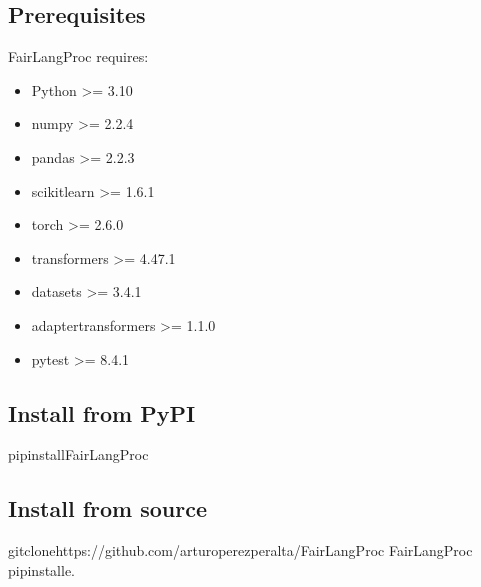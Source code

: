 \documentclass[letterpaper,10pt,english]{sphinxmanual}
\begin{document}
\subsection{Prerequisites}
\label{\detokenize{getting_started:prerequisites}}
\sphinxAtStartPar
FairLangProc requires:
\begin{itemize}
\item {} 
\sphinxAtStartPar
Python \textgreater{}= 3.10

\item {} 
\sphinxAtStartPar
numpy \textgreater{}= 2.2.4

\item {} 
\sphinxAtStartPar
pandas \textgreater{}= 2.2.3

\item {} 
\sphinxAtStartPar
scikit\sphinxhyphen{}learn \textgreater{}= 1.6.1

\item {} 
\sphinxAtStartPar
torch \textgreater{}= 2.6.0

\item {} 
\sphinxAtStartPar
transformers \textgreater{}= 4.47.1

\item {} 
\sphinxAtStartPar
datasets \textgreater{}= 3.4.1

\item {} 
\sphinxAtStartPar
adapter\sphinxhyphen{}transformers \textgreater{}= 1.1.0

\item {} 
\sphinxAtStartPar
pytest \textgreater{}= 8.4.1

\end{itemize}


\subsection{Install from PyPI}
\label{\detokenize{getting_started:install-from-pypi}}
\begin{sphinxVerbatim}[commandchars=\\\{\}]
pipinstallFairLangProc
\end{sphinxVerbatim}


\subsection{Install from source}
\label{\detokenize{getting_started:install-from-source}}
\begin{sphinxVerbatim}[commandchars=\\\{\}]
gitclonehttps://github.com/arturo\PYGZhy{}perez\PYGZhy{}peralta/FairLangProc
FairLangProc
pipinstall\PYGZhy{}e.
\end{sphinxVerbatim}
\end{document}
